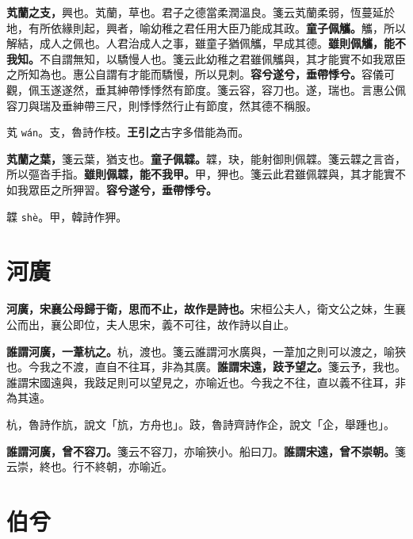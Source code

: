 \textbf{芄蘭之支，}{\footnotesize 興也。芄蘭，草也。君子之德當柔潤溫良。箋云芄蘭柔弱，恆蔓延於地，有所依緣則起，興者，喻幼稚之君任用大臣乃能成其政。}\textbf{童子佩觿。}{\footnotesize 觿，所以解結，成人之佩也。人君治成人之事，雖童子猶佩觿，早成其德。}\textbf{雖則佩觿，能不我知。}{\footnotesize 不自謂無知，以驕慢人也。箋云此幼稚之君雖佩觿與，其才能實不如我眾臣之所知為也。惠公自謂有才能而驕慢，所以見刺。}\textbf{容兮遂兮，垂帶悸兮。}{\footnotesize 容儀可觀，佩玉遂遂然，垂其紳帶悸悸然有節度。箋云容，容刀也。遂，瑞也。言惠公佩容刀與瑞及垂紳帶三尺，則悸悸然行止有節度，然其德不稱服。}

\begin{quoting}芄 \texttt{wán}。支，魯詩作枝。\textbf{王引之}古字多借能為而。\end{quoting}

\textbf{芄蘭之葉，}{\footnotesize 箋云葉，猶支也。}\textbf{童子佩韘。}{\footnotesize 韘，玦，能射御則佩韘。箋云韘之言沓，所以彄沓手指。}\textbf{雖則佩韘，能不我甲。}{\footnotesize 甲，狎也。箋云此君雖佩韘與，其才能實不如我眾臣之所狎習。}\textbf{容兮遂兮，垂帶悸兮。}

\begin{quoting}韘 \texttt{shè}。甲，韓詩作狎。\end{quoting}

\section{河廣}


\textbf{河廣，宋襄公母歸于衛，思而不止，故作是詩也。}{\footnotesize 宋桓公夫人，衛文公之妹，生襄公而出，襄公即位，夫人思宋，義不可往，故作詩以自止。}

\textbf{誰謂河廣，一葦杭之。}{\footnotesize 杭，渡也。箋云誰謂河水廣與，一葦加之則可以渡之，喻狹也。今我之不渡，直自不往耳，非為其廣。}\textbf{誰謂宋遠，跂予望之。}{\footnotesize 箋云予，我也。誰謂宋國遠與，我跂足則可以望見之，亦喻近也。今我之不往，直以義不往耳，非為其遠。}

\begin{quoting}杭，魯詩作斻，說文「斻，方舟也」。跂，魯詩齊詩作企，說文「企，舉踵也」。\end{quoting}

\textbf{誰謂河廣，曾不容刀。}{\footnotesize 箋云不容刀，亦喻狹小。船曰刀。}\textbf{誰謂宋遠，曾不崇朝。}{\footnotesize 箋云崇，終也。行不終朝，亦喻近。}

\section{伯兮}

